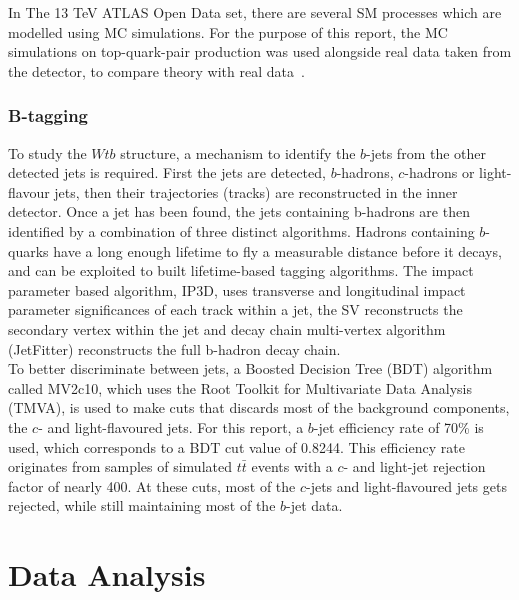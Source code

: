 \documentclass[12pt,a4paper]{article}
\numberwithin{equation}{section}
\begin{document}
In The 13 TeV ATLAS Open Data set, there are several SM processes which are
modelled using MC simulations. For the purpose of this report, the MC
simulations on top-quark-pair production was used alongside real data taken from
the detector, to compare theory with real data~\cite{mcopenatlas}.


\subsubsection{B-tagging}
To study the $Wtb$ structure, a mechanism to identify the $b$-jets from the
other detected jets is required. First the jets are detected, $b$-hadrons,
$c$-hadrons or light-flavour jets, then their trajectories (tracks) are
reconstructed in the inner detector. Once a jet has been found, the jets
containing b-hadrons are then identified by a combination of three distinct
algorithms. Hadrons containing $b$-quarks have a long enough lifetime to fly a
measurable distance before it decays, and can be exploited to built
lifetime-based tagging algorithms. The impact parameter based algorithm, IP3D,
uses transverse and longitudinal impact parameter significances of each track
within a jet, the SV reconstructs the secondary vertex within the jet and decay
chain multi-vertex algorithm (JetFitter) reconstructs the full b-hadron
decay chain.\\

To better discriminate between jets, a Boosted Decision Tree (BDT) algorithm
called MV2c10, which uses the Root Toolkit for Multivariate Data Analysis
(TMVA), is used to make cuts that discards most of the background components,
the $c$- and light-flavoured jets. For this report, a $b$-jet efficiency rate of
70\% is used, which corresponds to a BDT cut value of 0.8244. This efficiency
rate originates from samples of simulated $t\bar t$ events with a $c$- and
light-jet rejection factor of nearly 400\cite{ATL-PHYS-PUB-2016-012}. At these
cuts, most of the $c$-jets and light-flavoured jets gets rejected, while still
maintaining most of the $b$-jet data.


\section{Data Analysis}
\end{document}
